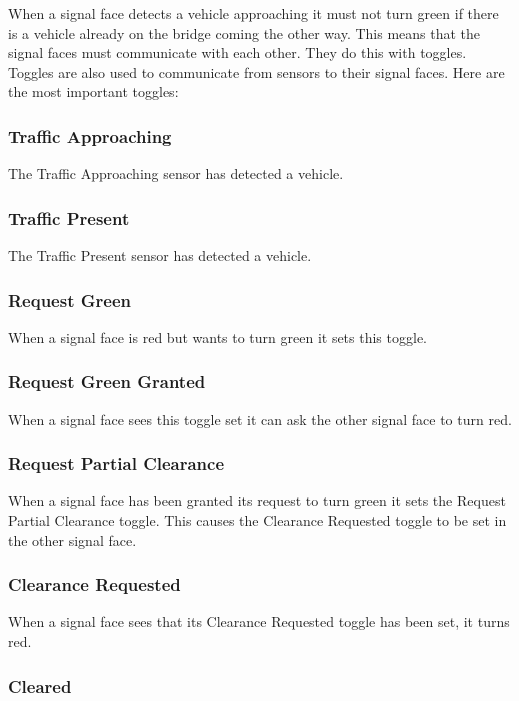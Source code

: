 \documentclass[letterpaper,twoside]{article}
\begin{document}
When a signal face detects a vehicle approaching it must not turn green
if there is a vehicle already on the bridge coming the other way.
This means that the signal faces must communicate with each other.
They do this with toggles.  Toggles are also used to communicate
from sensors to their signal faces.  Here are the most important toggles:

\subsubsection{Traffic Approaching}

The Traffic Approaching sensor has detected a vehicle.

\subsubsection{Traffic Present}

The Traffic Present sensor has detected a vehicle.

\subsubsection{Request Green}

When a signal face is red but wants to turn green it sets this toggle.

\subsubsection{Request Green Granted}

When a signal face sees this toggle set it can ask the other signal
face to turn red.

\subsubsection{Request Partial Clearance}

When a signal face has been granted its request to turn green it sets
the Request Partial Clearance toggle.  This causes the Clearance Requested
toggle to be set in the other signal face.

\subsubsection{Clearance Requested}

When a signal face sees that its Clearance Requested toggle has been
set, it turns red.

\subsubsection{Cleared}
\end{document}
